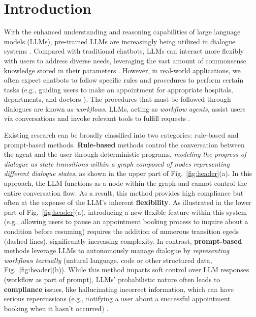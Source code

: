 \section{Introduction} \label{sec:intro}

\figHeader
\figSessions

With the enhanced understanding and reasoning capabilities of large language models (LLMs), pre-trained LLMs are increasingly being utilized in dialogue systems \citep{SPACE-3,TOD-Adapters}. Compared with traditional chatbots, LLMs can interact more flexibly with users to address diverse needs, leveraging the vast amount of commonsense knowledge stored in their parameters \citep{LLM-dialogue-survey}. However, in real-world applications, we often expect chatbots to follow specific rules and procedures to perform certain tasks (e.g., guiding users to make an appointment for appropriate hospitals, departments, and doctors \citep{STAR,SPACE-3}). The procedures that must be followed through dialogues are known as \emph{workflows}. LLMs, acting as \emph{workflow agents}, assist users via conversations and invoke relevant tools to fulfill requests \citep{FlowBench}.

Existing research can be broadly classified into two categories: rule-based and prompt-based methods.
\textbf{Rule-based} methods \citep{coze,dify,flowise} control the conversation between the agent and the user through deterministic programs, \emph{modeling the progress of dialogue as state transitions within a graph composed of nodes representing different dialogue states}, as shown in the upper part of Fig.~\ref{fig:header}(a). 
In this approach, the LLM functions as a node within the graph and cannot control the entire conversation flow. As a result, this method provides high compliance but often at the expense of the LLM's inherent \textbf{flexibility}. As illustrated in the lower part of Fig.~\ref{fig:header}(a), introducing a new flexible feature within this system (e.g., allowing users to pause an appointment booking process to inquire about a condition before resuming) requires the addition of numerous transition egeds (dashed lines), significantly increasing complexity.
In contrast, \textbf{prompt-based} methods leverage LLMs to autonomously manage dialogue by \emph{representing workflows textually} (natural language, code or other structured data, Fig.~\ref{fig:header}(b)). 
While this method imparts soft control over LLM responses (workflow as part of prompt), LLMs' probabilistic nature often leads to \textbf{compliance} issues, like hallucinating incorrect information, which can have serious repercussions (e.g., notifying a user about a successful appointment booking when it hasn't occurred) \citep{Hallucination-survey}.

